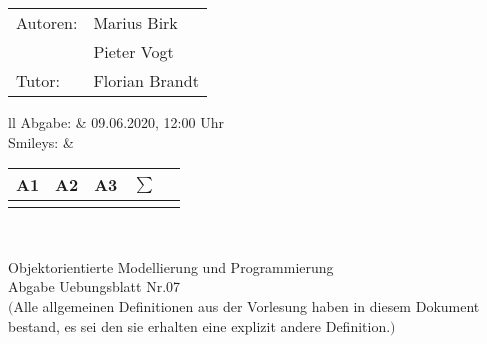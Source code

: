 \documentclass[12pt,a4paper,oneside,ngerman]{article}
\newcommand{\fach}{Objektorientierte Modellierung und Programmierung}
\newcommand{\dokumentenTitel}{Abgabe Uebungsblatt Nr.07}
\newcommand{\Abgabe}{09.06.2020, 12:00 Uhr}
\newcommand{\memberOne}{Marius Birk}
\newcommand{\memberTwo}{Pieter Vogt}
\newcommand{\tutor}{ Florian Brandt }
\begin{document}
	\thispagestyle{plain} %
	
	\begin{multicols}{2} %
		\hspace{-1cm} %
		\begin{tabular}{ll} %
			Autoren: & \memberOne \\ %
			& \memberTwo \\
			Tutor: & \tutor \\  
		\end{tabular}
		
		\columnbreak %
		\hspace{-1cm} %
		\begin{tabular}{ll} %
			Abgabe: & \Abgabe \\ %
			Smileys: &  
			\renewcommand{\arraystretch}{1.2} 
			\begin{tabular}{|p{0.8cm}|p{0.8cm}|p{0.8cm}|p{0.8cm}|p{0.8cm}|}
				\hline A1 & A2 & A3 &$\sum\limits^{ }$ \\ \hline
				& & & \\ \hline    
			\end{tabular} \\
		\end{tabular}
		
	\end{multicols} %
	
	\begin{center}
		\Large{\fach} \\
		\LARGE{\dokumentenTitel} \\
		\small
		$($Alle allgemeinen Definitionen aus der Vorlesung haben in diesem Dokument bestand, es sei den sie erhalten eine explizit andere Definition.$)$
	\end{center}
\end{document}
